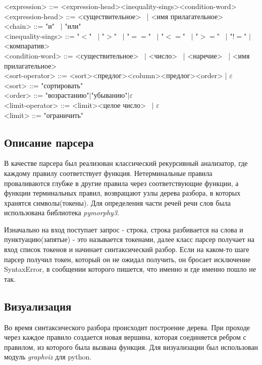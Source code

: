 \documentclass[12pt, a4paper]{article}
\begin{document}
\begin{tcolorbox}
            <expression> ::= <expression-head><inequality-sings><condition-word> \\
            <expression-head> ::= <существительное> \ | <имя прилагательное>\\
            <chain> ::= "и" \ $|$ "или" \\
            <inequality-sings> ::= "$<$" \ $|$ "$>$" \ $|$ "$==$" \ $|$ "$<=$" \ $|$ "$>=$" \ $|$ "$!=$" $|$ <компаратив>\\
            <condition-word> ::= <существительное> \ $|$ <число> \ | <наречие> \ | <имя прилагательное> \\
            <sort-operator> ::= <sort><предлог><column><предлог><order> | $\varepsilon$ \\
            <sort> ::= "сортировать" \\
            <order> ::= "возрастанию"$|$"убыванию"$|$$\varepsilon$ \\
            <limit-operator> ::= <limit><целое число> \ $|$ $\varepsilon$ \\
            <limit> ::= "ограничить"
        \end{tcolorbox}
    \pagebreak
    \subsection{Описание парсера}
    В качестве парсера был реализован классический рекурсивный анализатор, где каждому правилу соответствует функция.
    Нетерминальные правила проваливаются глубже в другие правила через соответствующие функции, а функции терминальных правил, возвращают 
    узлы дерева разбора, в которых хранятся символы(токены). Для определения части речей речи слов была использована библиотека \emph{pymorphy3}.
    
    Изначально на вход поступает запрос - строка, строка разбивается на слова и пунктуацию(запятые) - это называется токенами, далее класс парсер
    получает на вход список токенов и начинает синтаксический разбор. Если на каком-то шаге парсер получил токен, который он не ожидал получить, он бросает исключение SyntaxError, 
    в сообщении которого пишется, что именно и где именно пошло не так. 
    
    \subsection{Визуализация}
    Во время синтаксического разбора происходит построение дерева. При проходе через каждое правило создается новая вершина,
    которая соединяется ребром с правилом, из которого была вызвана функция. Для визуализации был использован модуль \emph{graphviz} для python.
    \pagebreak
\end{document}
